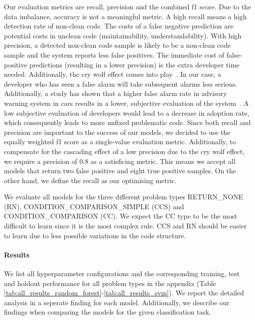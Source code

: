 Our evaluation metrics are recall, precision and the combined f1 score. Due to the data imbalance, accuracy is not a meaningful metric. A high recall means a high detection rate of non-clean code. The costs of a false negative prediction are potential costs in unclean code (maintainability, understandability). With high precision, a detected non-clean code sample is likely to be a non-clean code sample and the system reports less false positives. The immediate cost of false-positive predictions (resulting in a lower precision) is the extra developer time needed. Additionally, the cry wolf effect comes into play~\cite{breznitz_cry_1984}. In our case, a developer who has seen a false alarm will take subsequent alarms less serious. Additionally, a study has shown that a higher false alarm rate in advisory warning system in cars results in a lower, subjective evaluation of the system~\cite{naujoks_cooperative_2016}. A low subjective evaluation of developers would lead to a decrease in adoption rate, which consequently leads to more unfixed problematic code. Since both recall and precision are important to the success of our models, we decided to use the equally weighted f1 score as a single-value evaluation metric.
Additionally, to compensate for the cascading effect of a low precision due to the cry wolf effect, we require a precision of 0.8 as a satisficing metric. This means we accept all models that return two false positive and eight true positive samples. On the other hand, we define the recall as our optimising metric.

We evaluate all models for the three different problem types RETURN\_NONE (RN), CONDITION\_COMPARISON\_SIMPLE (CCS) and CONDITION\_COMPARISON (CC). We expect the CC type to be the most difficult to learn since it is the most complex rule. CCS and RN should be easier to learn due to less possible  variations in the code structure.

\paragraph{Results}
We list all hyperparameter configurations and the corresponding training, test and holdout performance for all problem types in the appendix (Table \ref{tab:all_results_random_forest}-\ref{tab:all_results_svm}). We report the detailed analysis in a seperate finding for each model. Additionally, we describe our findings when comparing the models for the given classification task.



